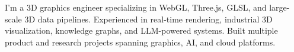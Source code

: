 

\begin{onecolentry}
	I'm a 3D graphics engineer specializing in WebGL, Three.js, GLSL, and large-scale 3D data pipelines. Experienced in real-time rendering, industrial 3D visualization, knowledge graphs, and LLM-powered systems. Built multiple product and research projects spanning graphics, AI, and cloud platforms.
	
\end{onecolentry}
